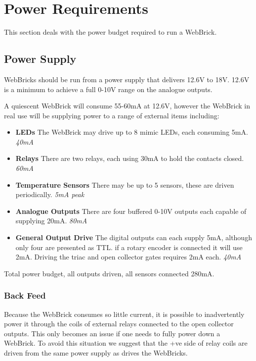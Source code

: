 \section{Power Requirements}

 This section deals with the power budget required to run a WebBrick.
 
 \subsection{Power Supply}
 
    WebBricks should be run from a power supply that delivers 12.6V to 18V.  12.6V is a minimum to achieve a full 0-10V range on
    the analogue outputs.
    
    A quiescent WebBrick will consume 55-60mA at 12.6V, however the WebBrick in real use will be supplying power to a range of external items
    including:
 	
\begin{itemize}

\item{\bf LEDs} The WebBrick may drive up to 8 mimic LEDs, each consuming 5mA. {\it 40mA}

\item{\bf Relays} There are two relays, each using 30mA to hold the contacts closed. {\it 60mA}

\item{\bf Temperature Sensors} There may be up to 5 sensors, these are driven periodically. {\it 5mA peak}

\item{\bf Analogue Outputs} There are four buffered 0-10V outputs each capable of supplying 20mA. {\it 80mA}

\item{\bf General Output Drive} The digital outputs can each supply 5mA, although only four are presented as TTL.
if a rotary encoder is connected it will use 2mA.  Driving the triac and open collector gates requires 2mA each. {\it 40mA}

\end{itemize}

Total power budget, all outputs driven, all sensors connected 280mA.
 	
 	
\subsubsection{Back Feed}
 	
    Because the WebBrick consumes so little current, it is possible to inadvertently 
    power it through the coils of external relays connected to 
    the open collector outputs.  This only becomes an issue if one needs to fully power 
    down a WebBrick. To avoid this situation we suggest
    that the +ve side of relay coils are driven from the same power supply as drives the WebBricks.